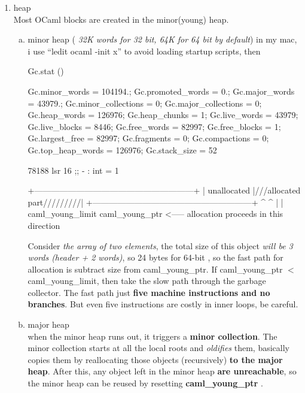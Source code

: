 \begin{enumerate}
\item heap \\
  Most OCaml blocks are created in the minor(young) heap.
  \begin{enumerate}[(a)]
  \item minor heap ( \textit{32K words for 32 bit, 64K for 64 bit by default})
    in my mac,  i use ``ledit ocaml -init x'' to avoid loading startup
    scripts, then 
\begin{alternate}
Gc.stat ()
\end{alternate}
\begin{ocamlcode}
{Gc.minor_words = 104194.; Gc.promoted_words = 0.; Gc.major_words = 43979.;
 Gc.minor_collections = 0; Gc.major_collections = 0; Gc.heap_words = 126976;
 Gc.heap_chunks = 1; Gc.live_words = 43979; Gc.live_blocks = 8446;
 Gc.free_words = 82997; Gc.free_blocks = 1; Gc.largest_free = 82997;
 Gc.fragments = 0; Gc.compactions = 0; Gc.top_heap_words = 126976;
 Gc.stack_size = 52}  
\end{ocamlcode}

\begin{alternate}
78188 lsr 16 ;;
- : int = 1
\end{alternate}


    

\begin{bluetext}
+---------------------------------------------------------+
| unallocated                  |///allocated part/////////|
+---------------------------------------------------------+
 ^                              ^
 |                              |
caml_young_limit             caml_young_ptr
                      <----- allocation proceeds
                            in this direction
\end{bluetext}

    
    Consider \textit{the array of two elements}, the total size of this object \textit{will be 3 words (header + 2 words)}, so 24 bytes for 64-bit , so the fast path for allocation is
    subtract size from caml\_young\_ptr.
    If caml\_young\_ptr $<$ caml\_young\_limit, then take the slow path through the garbage collector.
    The fast path just \textbf{ five machine instructions and no branches}. But even
    five instructions are costly in inner loops, be careful.
  \item major heap \\
    when the minor heap runs out, it triggers a \textbf{minor collection}. The minor
    collection starts at all the local roots and \textit{oldifies} them, basically copies
    them by reallocating those objects (recursively) \textbf{ to the major heap}. After
    this, any object left in the minor heap \textbf{ are unreachable}, so the minor heap
    can be reused by resetting \textbf{ caml\_young\_ptr }.


\end{enumerate}
\end{enumerate}
